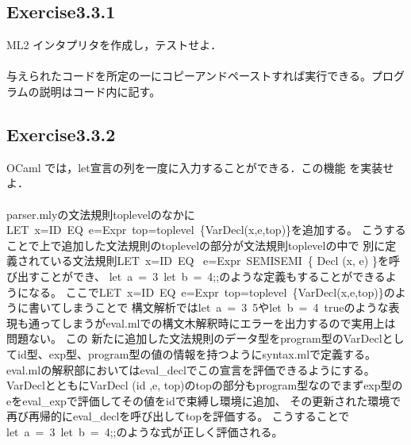 \documentclass[a4paper,11pt,oneside,openany]{jsarticle}
\begin{document}
\subsection{Exercise3.3.1}
    ML2 インタプリタを作成し，テストせよ．\\\\
    与えられたコードを所定の一にコピーアンドペーストすれば実行できる。プログラムの説明はコード内に記す。

\subsection{Exercise3.3.2}
    OCaml では，let宣言の列を一度に入力することができる．この機能 を実装せよ．\\\\
    parser.mlyの文法規則toplevelのなかに LET\ x=ID\ EQ\ e=Expr\ top=toplevel\ \{VarDecl(x,e,top)\}を追加する。
    こうすることで上で追加した文法規則のtoplevelの部分が文法規則toplevelの中で
    別に定義されている文法規則LET\ x=ID\ EQ \ e=Expr\ SEMISEMI\ \{ Decl (x, e) \}を呼び出すことができ、
    let\ a\ =\ 3\ let\ b\ =\ 4;;のような定義もすることができるようになる。
    ここでLET\ x=ID\ EQ\ e=Expr\ top=toplevel\ \{VarDecl(x,e,top)\}のように書いてしまうことで
    構文解析ではlet\ a\ =\ 3\ 5やlet\ b\ =\ 4\ trueのような表現も通ってしまうがeval.mlでの構文木解釈時にエラーを出力するので実用上は問題ない。
    この 新たに追加した文法規則のデータ型をprogram型のVarDeclとしてid型、exp型、program型の値の情報を持つようにsyntax.mlで定義する。
    eval.mlの解釈部においてはeval\_declでこの宣言を評価できるようにする。
    VarDeclとともにVarDecl (id ,e, top)のtopの部分もprogram型なのでまずexp型のeをeval\_expで評価してその値をidで束縛し環境に追加、
    その更新された環境で再び再帰的にeval\_declを呼び出してtopを評価する。
    こうすることでlet\ a\ =\ 3\ let\ b\ =\ 4;;のような式が正しく評価される。
\end{document}
